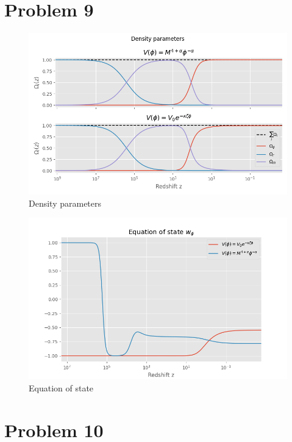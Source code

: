 \documentclass[reprint,english,notitlepage]{revtex4-1}  %
\begin{document}
\section{Problem 9}
\begin{figure}[h!]
	\includegraphics[scale=0.4]{density_parameters.png}
	\caption{Density parameters}
	\label{}
\end{figure}


\begin{figure}[h!]
	\includegraphics[scale=0.4]{eos.png}
	\caption{Equation of state}
	\label{}
\end{figure}

\section{Problem 10}
\end{document}
